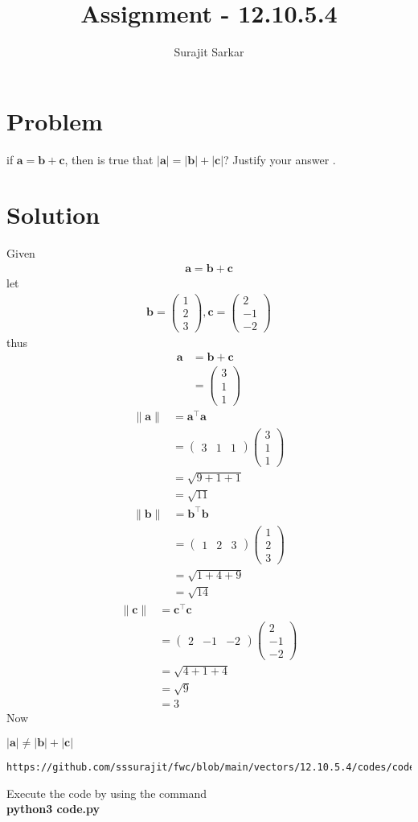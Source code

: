 \documentclass[journal,12pt,twocolumn]{IEEEtran}
\title{\mytitle}
\title{
Assignment - 12.10.5.4
}
\author{Surajit Sarkar}
\newcommand{\myvec}[1]{\ensuremath{\begin{pmatrix}#1\end{pmatrix}}}
\providecommand{\norm}[1]{\lVert#1\rVert}
\let\vec\mathbf
\begin{document}
\maketitle
\tableofcontents
\bigskip
\section{\textbf{Problem}}
if $\vec{a}=\vec{b}+\vec{c}$, then is true that $|\vec{a}|=|\vec{b}|+|\vec{c}|$?
Justify your answer .
\section{\textbf{Solution}}
Given
\begin{align}
    \vec{a}=\vec{b}+\vec{c}
\end{align}
let
\begin{align}
    \vec{b}=\myvec{1\\2\\3},\vec{c}=\myvec{2\\-1\\-2}
\end{align}
thus
\begin{align}
    \vec{a}&=\vec{b}+\vec{c}\\
    &=\myvec{3\\1\\1}
\end{align}
\begin{align}
    \norm{\vec{a}}&=\vec{a}^{\top}\vec{a}\\
    &=\myvec{3&1&1}\myvec{3\\1\\1}\\
    &=\sqrt{9+1+1}\\
    &=\sqrt{11}
\end{align}
\begin{align}
    \norm{\vec{b}}&=\vec{b}^{\top}\vec{b}\\
    &=\myvec{1&2&3}\myvec{1\\2\\3}\\
    &=\sqrt{1+4+9}\\
    &=\sqrt{14}
\end{align}
\begin{align}
    \norm{\vec{c}}&=\vec{c}^{\top}\vec{c}\\
    &=\myvec{2&-1&-2}\myvec{2\\-1\\-2}\\
    &=\sqrt{4+1+4}\\
    &=\sqrt{9}\\
    &=3
\end{align}
Now
\begin{center}
    $|\vec{a}|\neq|\vec{b}|+|\vec{c}|$
\end{center}
\begin{lstlisting}
https://github.com/sssurajit/fwc/blob/main/vectors/12.10.5.4/codes/code.py
\end{lstlisting}
Execute the code by using the command\\
\textbf{python3 code.py}
\end{document}
